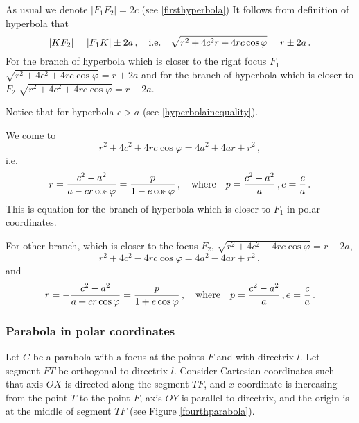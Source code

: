 \documentclass[12pt]{article}
\numberwithin{equation}{section}
\begin{document}
{As usual we denote
  $|F_1F_2|=2c$ (see \eqref{firsthyperbola})
It follows from definition of hyperbola
that
                 $$
  |KF_2|=|F_1K|\pm 2a\,,\quad {\rm i.e.}\quad
 \sqrt{r^2+4c^2r+4rc\cos\varphi}=r\pm 2a\,.
                 $$
For the branch of hyperbola which is closer
to the right focus $F_1$ 
 $\sqrt{r^2+4c^2+4rc\cos\varphi}=r+2a$
and for the branch of hyperbola which is closer
to $F_2$ 
 $\sqrt{r^2+4c^2+4rc\cos\varphi}=r-2a$.

Notice that for hyperbola $c>a$ (see 
\eqref{hyperbolainequality}).


We come to 
           $$
r^2+4c^2+4rc\cos\varphi=4a^2+4ar+r^2\,,
            $$
  i.e.
             \begin{equation}\label{branchofhypinpolarcoordinates}
        r={c^2-a^2\over a-cr\cos\varphi}=
{p\over 1-e\cos\varphi}\,,
\quad {\rm where}\quad p={c^2-a^2\over a}\,,
           e={c\over a}\,.
               \end{equation}
This is equation for the branch of hyperbola which is closer to $F_1$
in polar coordinates.

For other branch, which is closer to the focus $F_2$,
$\sqrt{r^2+4c^2-4rc\cos\varphi}=r-2a$,
           $$
r^2+4c^2-4rc\cos\varphi=4a^2-4ar+r^2\,,
            $$
and
             \begin{equation*}
        r=-{c^2-a^2\over a+cr\cos\varphi}=
{p\over 1+e\cos\varphi}\,,
\quad {\rm where}\quad p={c^2-a^2\over a}\,,
           e={c\over a}\,.
               \end{equation*}

}



\subsubsection{ Parabola in polar coordinates}
\label{parabolainpolar}


  Let $C$ be a parabola  with a focus at the points $F$
and with directrix $l$.
  Let segment $FT$ be orthogonal to directrix $l$.
Consider Cartesian coordinates such that
axis $OX$ is directed along the segment $TF$,
and $x$ coordinate is increasing from  the point $T$
to the point $F$, axis 
$OY$ is parallel to directrix, and the origin
 is at the middle of segment $TF$
(see Figure \eqref{fourthparabola}).
\end{document}
